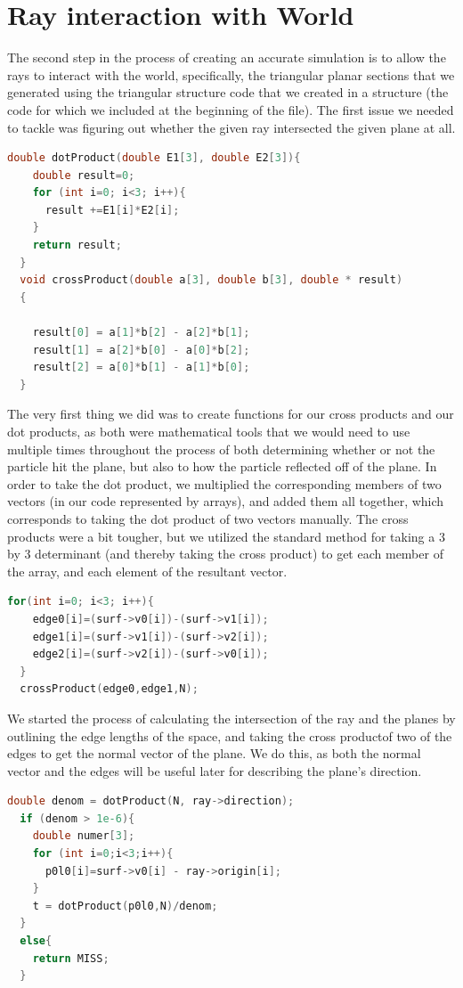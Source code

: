 \documentclass{article}
\begin{document}
\section{Ray interaction with World}
The second step in the process of creating an accurate simulation is to allow the rays to interact with
the world, specifically, the triangular planar sections that we generated using the triangular structure
code that we created in a structure (the code for which we included at the beginning of the file). The first
issue we needed to tackle was figuring out whether the given ray intersected the given plane at all.
\begin{lstlisting}[language=C]
  double dotProduct(double E1[3], double E2[3]){
    double result=0;
    for (int i=0; i<3; i++){
      result +=E1[i]*E2[i];
    }
    return result;
  }
  void crossProduct(double a[3], double b[3], double * result)
  {
    
    result[0] = a[1]*b[2] - a[2]*b[1];
    result[1] = a[2]*b[0] - a[0]*b[2];
    result[2] = a[0]*b[1] - a[1]*b[0];
  }
\end{lstlisting}
The very first thing we did was to create functions for our cross products and our dot products, as both were
mathematical tools that we would need to use multiple times throughout the process of both determining whether
or not the particle hit the plane, but also to how the particle reflected off of the plane. In order to take the dot
product, we multiplied the corresponding members of two vectors (in our code represented by arrays), and added them all
together, which corresponds to taking the dot product of two vectors manually. The cross products were a bit tougher, but
we utilized the standard method for taking a 3 by 3 determinant (and thereby taking the cross product) to get each member
of the array, and each element of the resultant vector.
\begin{lstlisting}[language=C]
  for(int i=0; i<3; i++){
    edge0[i]=(surf->v0[i])-(surf->v1[i]);
    edge1[i]=(surf->v1[i])-(surf->v2[i]);
    edge2[i]=(surf->v2[i])-(surf->v0[i]);
  }
  crossProduct(edge0,edge1,N);
\end{lstlisting}
We started the process of calculating the intersection of the ray and the planes  by outlining the edge lengths of
the space, and taking the cross productof two of the edges to get the normal vector of the plane. We do this, as both
the normal vector and the edges will be useful later for describing the plane's direction.
\begin{lstlisting}[language=C]
  double denom = dotProduct(N, ray->direction);
  if (denom > 1e-6){
    double numer[3];
    for (int i=0;i<3;i++){
      p0l0[i]=surf->v0[i] - ray->origin[i];
    }
    t = dotProduct(p0l0,N)/denom;
  }
  else{
    return MISS;
  }
\end{lstlisting}
\end{document}
